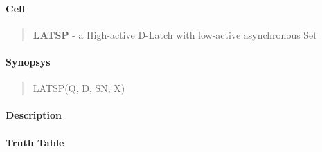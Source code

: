 \label{LATSP}
\paragraph{Cell}
\begin{quote}
    \textbf{LATSP} - a High-active D-Latch with low-active asynchronous Set
\end{quote}

\paragraph{Synopsys}
\begin{quote}
    LATSP(Q, D, SN, X)
\end{quote}

\paragraph{Description}

%

\paragraph{Truth Table}
%

